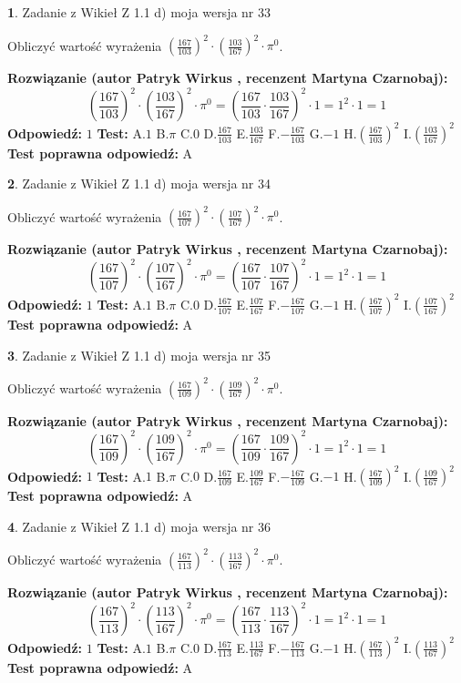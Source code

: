 \documentclass[12pt, a4paper]{article}
\theoremstyle{definition} %
\newtheorem{zad}{}
\newcommand{\zadStart}[1]{\begin{zad}#1\newline}
\newcommand{\zadStop}{\end{zad}}
\newcommand{\rozwStart}[2]{\noindent \textbf{Rozwiązanie (autor #1 , recenzent #2): }\newline}
\newcommand{\rozwStop}{\newline}
\newcommand{\odpStart}{\noindent \textbf{Odpowiedź:}\newline}
\newcommand{\odpStop}{\newline}
\newcommand{\testStart}{\noindent \textbf{Test:}\newline}
\newcommand{\testStop}{\newline}
\newcommand{\kluczStart}{\noindent \textbf{Test poprawna odpowiedź:}\newline}
\newcommand{\kluczStop}{\newline}
\begin{document}
\zadStart{Zadanie z Wikieł Z 1.1 d) moja wersja nr 33}

Obliczyć wartość wyrażenia $(\frac{167}{103})^{2} \cdot (\frac{103}{167})^{2} \cdot \pi^{0}$.
\zadStop
\rozwStart{Patryk Wirkus}{Martyna Czarnobaj}
$$(\frac{167}{103})^{2} \cdot (\frac{103}{167})^{2} \cdot \pi^{0} = (\frac{167}{103} \cdot \frac{103}{167})^{2} \cdot 1 = 1^{2} \cdot 1 = 1$$
\rozwStop
\odpStart
$1$
\odpStop
\testStart
A.$1$ B.$\pi$ C.$0$ D.$\frac{167}{103}$ E.$\frac{103}{167}$
F.$-\frac{167}{103}$ G.$-1$
H.$(\frac{167}{103})^{2}$
I.$(\frac{103}{167})^{2}$
\testStop
\kluczStart
A
\kluczStop



\zadStart{Zadanie z Wikieł Z 1.1 d) moja wersja nr 34}

Obliczyć wartość wyrażenia $(\frac{167}{107})^{2} \cdot (\frac{107}{167})^{2} \cdot \pi^{0}$.
\zadStop
\rozwStart{Patryk Wirkus}{Martyna Czarnobaj}
$$(\frac{167}{107})^{2} \cdot (\frac{107}{167})^{2} \cdot \pi^{0} = (\frac{167}{107} \cdot \frac{107}{167})^{2} \cdot 1 = 1^{2} \cdot 1 = 1$$
\rozwStop
\odpStart
$1$
\odpStop
\testStart
A.$1$ B.$\pi$ C.$0$ D.$\frac{167}{107}$ E.$\frac{107}{167}$
F.$-\frac{167}{107}$ G.$-1$
H.$(\frac{167}{107})^{2}$
I.$(\frac{107}{167})^{2}$
\testStop
\kluczStart
A
\kluczStop



\zadStart{Zadanie z Wikieł Z 1.1 d) moja wersja nr 35}

Obliczyć wartość wyrażenia $(\frac{167}{109})^{2} \cdot (\frac{109}{167})^{2} \cdot \pi^{0}$.
\zadStop
\rozwStart{Patryk Wirkus}{Martyna Czarnobaj}
$$(\frac{167}{109})^{2} \cdot (\frac{109}{167})^{2} \cdot \pi^{0} = (\frac{167}{109} \cdot \frac{109}{167})^{2} \cdot 1 = 1^{2} \cdot 1 = 1$$
\rozwStop
\odpStart
$1$
\odpStop
\testStart
A.$1$ B.$\pi$ C.$0$ D.$\frac{167}{109}$ E.$\frac{109}{167}$
F.$-\frac{167}{109}$ G.$-1$
H.$(\frac{167}{109})^{2}$
I.$(\frac{109}{167})^{2}$
\testStop
\kluczStart
A
\kluczStop



\zadStart{Zadanie z Wikieł Z 1.1 d) moja wersja nr 36}

Obliczyć wartość wyrażenia $(\frac{167}{113})^{2} \cdot (\frac{113}{167})^{2} \cdot \pi^{0}$.
\zadStop
\rozwStart{Patryk Wirkus}{Martyna Czarnobaj}
$$(\frac{167}{113})^{2} \cdot (\frac{113}{167})^{2} \cdot \pi^{0} = (\frac{167}{113} \cdot \frac{113}{167})^{2} \cdot 1 = 1^{2} \cdot 1 = 1$$
\rozwStop
\odpStart
$1$
\odpStop
\testStart
A.$1$ B.$\pi$ C.$0$ D.$\frac{167}{113}$ E.$\frac{113}{167}$
F.$-\frac{167}{113}$ G.$-1$
H.$(\frac{167}{113})^{2}$
I.$(\frac{113}{167})^{2}$
\testStop
\kluczStart
A
\kluczStop
\end{document}
